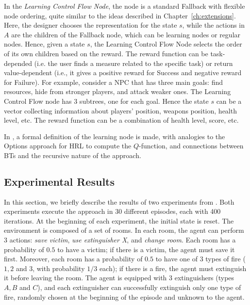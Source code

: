 In the \emph{Learning Control Flow Node}, the node is a standard Fallback with flexible node ordering, quite similar to the ideas described in Chapter~\ref{ch:extensions}. Here, the designer chooses the representation for the state $s$, while the actions in $A$ are the children of the Fallback node, which can be learning nodes or regular nodes. Hence, given a state $s$, the Learning Control Flow Node selects the order of its own children based on the reward. The reward function can be task-depended (i.e. the user finds a measure related to the specific task) or return value-dependent (i.e., it gives a positive reward for Success and negative reward for Failure). For example, consider a NPC that has three main goals: find resources, hide from stronger players, and attack weaker ones. 
The Learning Control Flow node has 3 subtrees, one for each goal. Hence the state $s$ can be a vector collecting information about players' position, weapons position, health level, etc. The reward function can be a combination of health level, score, etc. 

In \cite{pereira2015framework},
a formal definition of the learning node is made, with analogies to the Options approach for HRL to compute the $Q$-function,
and connections between BTs and the recursive nature of the approach.




\subsection{Experimental Results}
\label{sec:experiments}

In this section, we briefly describe the results of two experiments from \cite{pereira2015framework}. Both experiments execute the approach in 30 different episodes, each with 400 iterations. At the beginning of each experiment, the initial state is reset. 
The environment is composed of a set of rooms. In each room, the agent can perform $3$ actions: \emph{save victim}, \emph{use extinguisher X}, and \emph{change room}. Each room has a probability of $0.5$ to have a victim; if there is a victim, the agent must save it first. Moreover, each room has a probability of $0.5$ to have one of $3$ types of fire ($1, 2$ and $3$, with probability $1/3$ each); if there is a fire, the agent must extinguish it before leaving the room. The agent is equipped with $3$ extinguishers (types $A, B$ and $C$), and each extinguisher can successfully extinguish only one type of fire, randomly chosen at the beginning of the episode and unknown to the agent.


